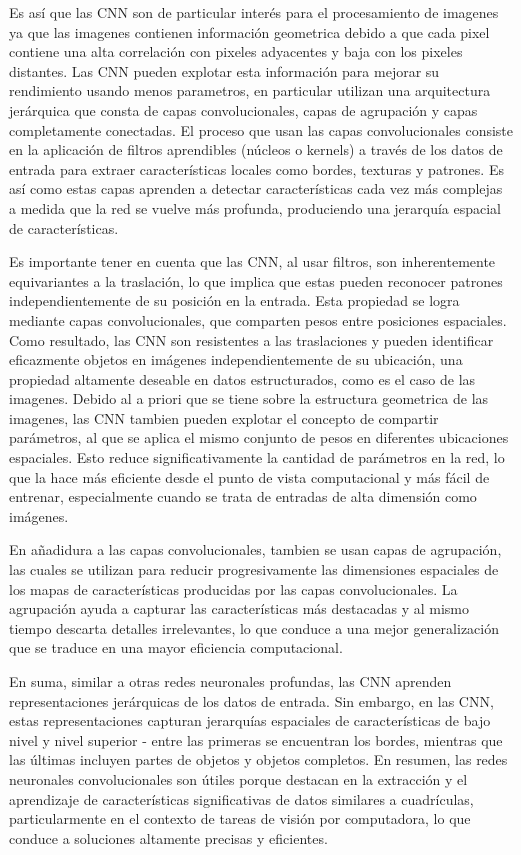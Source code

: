 \documentclass[12pt,letterpaper,final, openany]{scrbook}
\begin{document}
Es así que las CNN son de particular interés para el procesamiento de imagenes ya que las imagenes contienen información geometrica debido a que cada pixel contiene una alta correlación con pixeles adyacentes y baja con los pixeles distantes. Las CNN pueden explotar esta información para mejorar su rendimiento usando menos parametros, en particular utilizan una arquitectura jerárquica que consta de capas convolucionales, capas de agrupación y capas completamente conectadas. El proceso que usan las capas convolucionales consiste en la aplicación de filtros aprendibles (núcleos o kernels) a través de los datos de entrada para extraer características locales como bordes, texturas y patrones. Es así como estas capas aprenden a detectar características cada vez más complejas a medida que la red se vuelve más profunda, produciendo una jerarquía espacial de características.

Es importante tener en cuenta que las CNN, al usar filtros, son inherentemente equivariantes a la traslación, lo que implica que estas pueden reconocer patrones independientemente de su posición en la entrada. Esta propiedad se logra mediante capas convolucionales, que comparten pesos entre posiciones espaciales. Como resultado, las CNN son resistentes a las traslaciones y pueden identificar eficazmente objetos en imágenes independientemente de su ubicación, una propiedad altamente deseable en datos estructurados, como es el caso de las imagenes. Debido al a priori que se tiene sobre la estructura geometrica de las imagenes, las CNN tambien pueden explotar el concepto de compartir parámetros, al que se aplica el mismo conjunto de pesos en diferentes ubicaciones espaciales. Esto reduce significativamente la cantidad de parámetros en la red, lo que la hace más eficiente desde el punto de vista computacional y más fácil de entrenar, especialmente cuando se trata de entradas de alta dimensión como imágenes.

En añadidura a las capas convolucionales, tambien se usan capas de agrupación, las cuales se utilizan para reducir progresivamente las dimensiones espaciales de los mapas de características producidas por las capas convolucionales. La agrupación ayuda a capturar las características más destacadas y al mismo tiempo descarta detalles irrelevantes, lo que conduce a una mejor generalización que se traduce en una mayor eficiencia computacional.

En suma, similar a otras redes neuronales profundas, las CNN aprenden representaciones jerárquicas de los datos de entrada. Sin embargo, en las CNN, estas representaciones capturan jerarquías espaciales de características de bajo nivel y nivel superior - entre las primeras se encuentran los bordes, mientras que las últimas incluyen partes de objetos y objetos completos. En resumen, las redes neuronales convolucionales son útiles porque destacan en la extracción y el aprendizaje de características significativas de datos similares a cuadrículas, particularmente en el contexto de tareas de visión por computadora, lo que conduce a soluciones altamente precisas y eficientes.
\end{document}
